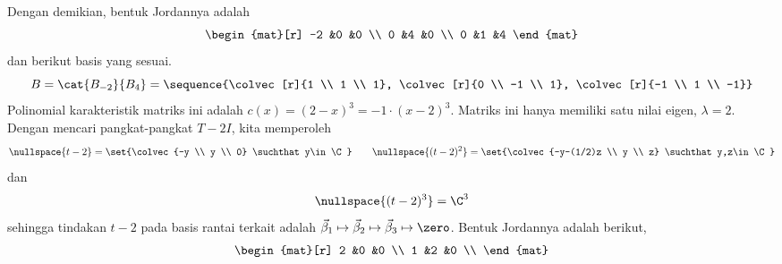 \begin{exercises}
\begin{answer}
\begin{exparts}
            Dengan demikian, bentuk Jordannya adalah
            \begin{equation*}
              \begin{mat}[r]
                -2  &0  &0  \\
                 0  &4  &0  \\
                 0  &1  &4
              \end{mat}
            \end{equation*}
            dan berikut basis yang sesuai.
            \begin{equation*}
              B=\cat{B_{-2}}{B_4}=
                \sequence{\colvec[r]{1 \\ 1 \\ 1},
                          \colvec[r]{0 \\ -1 \\ 1},
                          \colvec[r]{-1 \\ 1 \\ -1}}
            \end{equation*}
        \partsitem Polinomial karakteristik
            matriks ini adalah \( c(x)=(2-x)^3=-1\cdot (x-2)^3 \).
            Matriks ini hanya memiliki satu nilai eigen, $\lambda=2$.
            Dengan mencari pangkat-pangkat $T-2I$, kita memperoleh
            \begin{equation*}
              \nullspace{t-2}=\set{\colvec{-y \\ y \\ 0}
                                      \suchthat y\in\C} 
              \qquad
              \nullspace{(t-2)^2}=\set{\colvec{-y-(1/2)z \\ y \\ z}
                                          \suchthat y,z\in\C}
            \end{equation*}
            dan
            \begin{equation*} 
              \nullspace{(t-2)^3}=\C^3
            \end{equation*}
            sehingga
            tindakan $t-2$ pada
            basis rantai terkait adalah
            $\vec{\beta}_1\mapsto\vec{\beta}_2\mapsto
                   \vec{\beta}_3\mapsto\zero$.
            Bentuk Jordannya adalah berikut,
            \begin{equation*}
                  \begin{mat}[r]
                    2  &0  &0  \\
                    1  &2  &0  \\

\end{mat}
\end{equation*}
\end{exparts}
\end{answer}
\end{exercises}
